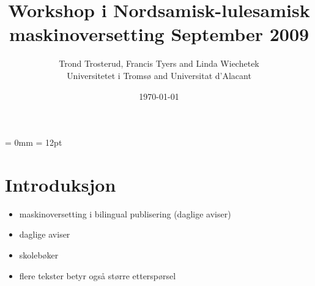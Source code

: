 \documentclass[a4paper,english,12pt]{article}
\begin{document}
\setcounter{secnumdepth}{3}
\setcounter{tocdepth}{3}
\begin{spacing}{1.0}


\newcommand{\tx}{\mbox{t\hspace{-.35em}-}} %

%  


\title{{\Large Workshop i Nordsamisk-lulesamisk maskinoversetting September 2009}} %




\author{Trond Trosterud, Francis Tyers and Linda Wiechetek \\
		Universitetet i Tromsø and Universitat d'Alacant}
\date{\today}

\maketitle




\thispagestyle{empty} %

\setcounter{page}{1} %

\parindent = 0mm
\parskip = 12pt



\section{Introduksjon}

\begin{itemize}
\item maskinoversetting i bilingual publisering (daglige aviser)
\item daglige aviser
\item skolebøker
\item flere tekster betyr også større etterspørsel
\end{itemize}
 

\end{spacing}
\end{document}
